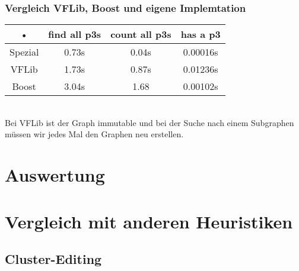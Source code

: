 \documentclass[12pt,a4paper,onecolumn,oneside,titlepage]{article}
\begin{document}
\subsubsection{Vergleich VFLib, Boost und eigene Implemtation}
\begin{tabular}{|c|c|c|c|}
\hline 
• & find all p3s & count all p3s & has a p3 \\ 
\hline 
Spezial & 0.73s & 0.04s & 0.00016s \\ 
\hline 
VFLib & 1.73s & 0.87s & 0.01236s \\ 
\hline 
Boost & 3.04s & 1.68 & 0.00102s \\ 
\hline 
\end{tabular} 
\\

Bei VFLib ist der Graph immutable und bei der Suche nach einem  Subgraphen müssen wir jedes Mal den Graphen neu erstellen.


\section{Auswertung}
\label{sec:results}

\section{Vergleich mit anderen Heuristiken}
\label{sec:compare}

\subsection{Cluster-Editing}
\end{document}

